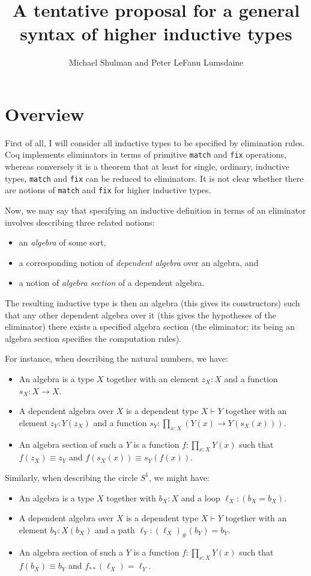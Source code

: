 \documentclass{amsart}
\title{A tentative proposal for a general syntax of higher inductive types}
\author{Michael Shulman and Peter LeFanu Lumsdaine}
\begin{document}
\maketitle

\section{Overview}
\label{sec:overview}

First of all, I will consider all inductive types to be specified by elimination rules.
Coq implements eliminators in terms of primitive \texttt{match} and \texttt{fix} operations, whereas conversely it is a theorem that at least for single, ordinary, inductive types, \texttt{match} and \texttt{fix} can be reduced to eliminators.
It is not clear whether there are notions of \texttt{match} and \texttt{fix} for higher inductive types.

Now, we may say that specifying an inductive definition in terms of an eliminator involves describing three related notions:
\begin{itemize}
\item an \emph{algebra} of some sort,
\item a corresponding notion of \emph{dependent algebra} over an algebra, and
\item a notion of \emph{algebra section} of a dependent algebra.
\end{itemize}
The resulting inductive type is then an algebra (this gives its constructors) such that any other dependent algebra over it (this gives the hypotheses of the eliminator) there exists a specified algebra section (the eliminator; its being an algebra section specifies the computation rules).

For instance, when describing the natural numbers, we have:
\begin{itemize}
\item An algebra is a type $X$ together with an element $z_X:X$ and a function $s_X:X\to X$.
\item A dependent algebra over $X$ is a dependent type $X\vdash Y$ together with an element $z_Y:Y(z_X)$ and a function $s_Y:\prod_{x:X} (Y(x) \to Y(s_X(x)))$.
\item An algebra section of such a $Y$ is a function $f:\prod_{x:X} Y(x)$ such that $f(z_X)\equiv z_Y$ and $f(s_X(x)) \equiv s_Y(f(x))$.
\end{itemize}
Similarly, when describing the circle $S^1$, we might have:
\begin{itemize}
\item An algebra is a type $X$ together with $b_X:X$ and a loop $\ell_X:(b_X = b_X)$.
\item A dependent algebra over $X$ is a dependent type $X\vdash Y$ together with an element $b_Y:X(b_X)$ and a path $\ell_Y:(\ell_X)_\#(b_Y) = b_Y$.
\item An algebra section of such a $Y$ is a function $f:\prod_{x:X} Y(x)$ such that $f(b_X) \equiv b_Y$ and $f_{**}(\ell_X) = \ell_Y$.
\end{itemize}
\end{document}
